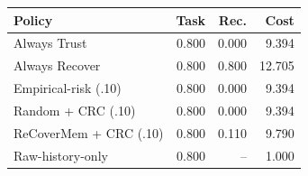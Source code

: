 \begin{tabular}{lrrr}
\toprule
Policy & Task & Rec. & Cost \\
\midrule
Always Trust & 0.800 & 0.000 & 9.394 \\
Always Recover & 0.800 & 0.800 & 12.705 \\
Empirical-risk (.10) & 0.800 & 0.000 & 9.394 \\
Random + CRC (.10) & 0.800 & 0.000 & 9.394 \\
ReCoverMem + CRC (.10) & 0.800 & 0.110 & 9.790 \\
\midrule
Raw-history-only & 0.800 & -- & 1.000 \\
\bottomrule
\end{tabular}
